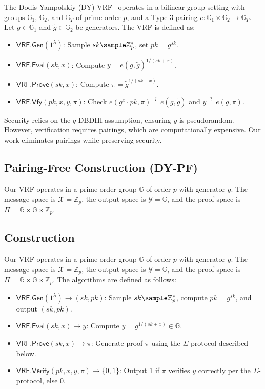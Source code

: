 The Dodis-Yampolskiy (DY) VRF~\cite{hutchison_verifiable_2005} operates in a bilinear group setting with groups $\mathbb{G}_1$, $\mathbb{G}_2$, and $\mathbb{G}_T$ of prime order $p$, and a Type-3 pairing $e: \mathbb{G}_1 \times \mathbb{G}_2 \to \mathbb{G}_T$. Let $g \in \mathbb{G}_1$ and $\tilde{g} \in \mathbb{G}_2$ be generators. The VRF is defined as:

\begin{itemize}
    \item $\mathsf{VRF.Gen}(1^\lambda)$: Sample $sk \sample \mathbb{Z}_p^*$, set $pk = g^{sk}$.
    \item $\mathsf{VRF.Eval}(sk, x)$: Compute $y = e(g, \tilde{g})^{1/(sk + x)}$.
    \item $\mathsf{VRF.Prove}(sk, x)$: Compute $\pi = \tilde{g}^{1/(sk + x)}$.
    \item $\mathsf{VRF.Vfy}(pk, x, y, \pi)$: Check $e(g^{x} \cdot pk, \pi) \stackrel{?}{=} e(g, \tilde{g})$ and $y \stackrel{?}{=} e(g, \pi)$.
\end{itemize}

Security relies on the $q$-DBDHI assumption, ensuring $y$ is pseudorandom. However, verification requires pairings, which are computationally expensive. Our work eliminates pairings while preserving security.


\subsection{Pairing-Free Construction (DY-PF)}\label{sec-dy-pf}

Our VRF operates in a prime-order group $\mathbb{G}$ of order $p$ with generator $g$. The message space is $\mathcal{X} = \mathbb{Z}_p$, the output space is $\mathcal{Y} = \mathbb{G}$, and the proof space is $\Pi = \mathbb{G} \times \mathbb{G} \times \mathbb{Z}_p$.

\subsection{Construction}

Our VRF operates in a prime-order group $\mathbb{G}$ of order $p$ with generator $g$. The message space is $\mathcal{X} = \mathbb{Z}_p$, the output space is $\mathcal{Y} = \mathbb{G}$, and the proof space is $\Pi = \mathbb{G} \times \mathbb{G} \times \mathbb{Z}_p$. The algorithms are defined as follows:

\begin{itemize}
    \item $\mathsf{VRF.Gen}(1^\lambda) \to (sk, pk)$: Sample $sk \sample \mathbb{Z}_p^*$, compute $pk = g^{sk}$, and output $(sk, pk)$.
    \item $\mathsf{VRF.Eval}(sk, x) \to y$: Compute $y = g^{1/(sk + x)} \in \mathbb{G}$.
    \item $\mathsf{VRF.Prove}(sk, x) \to \pi$: Generate proof $\pi$ using the $\Sigma$-protocol described below.
    \item $\mathsf{VRF.Verify}(pk, x, y, \pi) \to \{0, 1\}$: Output 1 if $\pi$ verifies $y$ correctly per the $\Sigma$-protocol, else 0.
\end{itemize}

